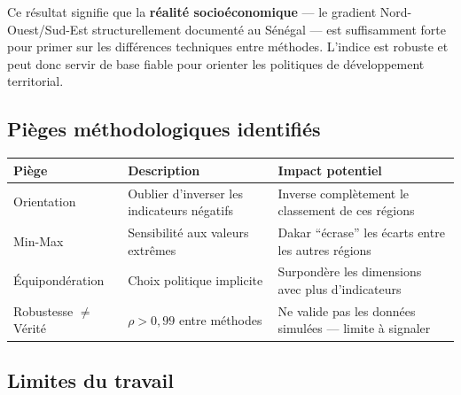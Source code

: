 \documentclass[
]{article}
\newcounter{none} %
\begin{document}
Ce résultat signifie que la \textbf{réalité socioéconomique} --- le
gradient Nord-Ouest/Sud-Est structurellement documenté au Sénégal ---
est suffisamment forte pour primer sur les différences techniques entre
méthodes. L'indice est robuste et peut donc servir de base fiable pour
orienter les politiques de développement territorial.

\subsection{Pièges méthodologiques
identifiés}\label{piuxe8ges-muxe9thodologiques-identifiuxe9s}

{\def\LTcaptype{none} %
\begin{longtable}[]{@{}
  >{\raggedright\arraybackslash}p{}
  >{\raggedright\arraybackslash}p{}
  >{\raggedright\arraybackslash}p{}@{}}
\toprule\noalign{}
\begin{minipage}[b]{\linewidth}\raggedright
Piège
\end{minipage} & \begin{minipage}[b]{\linewidth}\raggedright
Description
\end{minipage} & \begin{minipage}[b]{\linewidth}\raggedright
Impact potentiel
\end{minipage} \\
\midrule\noalign{}
\endhead
\bottomrule\noalign{}
\endlastfoot
Orientation & Oublier d'inverser les indicateurs négatifs & Inverse
complètement le classement de ces régions \\
Min-Max & Sensibilité aux valeurs extrêmes & Dakar ``écrase'' les écarts
entre les autres régions \\
Équipondération & Choix politique implicite & Surpondère les dimensions
avec plus d'indicateurs \\
Robustesse \(\neq\) Vérité & \(\rho > 0{,}99\) entre méthodes & Ne
valide pas les données simulées --- limite à signaler \\
\end{longtable}
}

\subsection{Limites du travail}\label{limites-du-travail}
\end{document}
